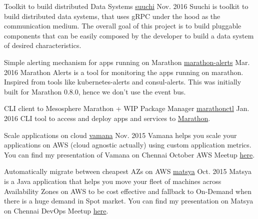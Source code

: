 
\begin{cventries}

  \cventry
    {Toolkit to build distributed Data Systems} %
    {\href{https://github.com/ashwanthkumar/suuchi}{suuchi}} %
    {Nov. 2016} %
    {} %
    {
    Suuchi is toolkit to build distributed data systems, that uses gRPC under the hood as the communication medium. The overall goal of this project is to build pluggable components that can be easily composed by the developer to build a data system of desired characteristics.
    }

  \cventry
    {Simple alerting mechanism for apps running on Marathon} %
    {\href{https://github.com/ashwanthkumar/marathon-alerts}{marathon-alerts}} %
    {Mar. 2016} %
    {} %
    {
    Marathon Alerts is a tool for monitoring the apps running on marathon. Inspired from tools like kubernetes-alerts and consul-alerts.
    This was initially built for Marathon 0.8.0, hence we don't use the event bus.
    }

  \cventry
    {CLI client to Mesosphere Marathon + WIP Package Manager} %
    {\href{https://github.com/ashwanthkumar/marathonctl}{marathonctl}} %
    {Jan. 2016} %
    {} %
    {
    CLI tool to access and deploy apps and services to \href{https://mesosphere.github.io/marathon/}{Marathon}.
    }

  \cventry
    {Scale applications on cloud} %
    {\href{https://github.com/indix/vamana}{vamana}} %
    {Nov. 2015} %
    {} %
    {
    Vamana helps you scale your applications on AWS (cloud agnostic actually) using custom application metrics.
    You can find my presentation of Vamana on Chennai October AWS Meetup \href{http://j.mp/to-vamana}{here}.
    }

  \cventry
    {Automatically migrate between cheapest AZs on AWS} %
    {\href{https://github.com/indix/matsya}{matsya}} %
    {Oct. 2015} %
    {} %
    {
    Matsya is a Java application that helps you move your fleet of machines across Availability Zones
    on AWS to be cost effective and fallback to On-Demand when there is a huge demand in Spot market.
    You can find my presentation on Matsya on Chennai DevOps Meetup \href{j.mp/to-matsya}{here}.
    }

\end{cventries}
